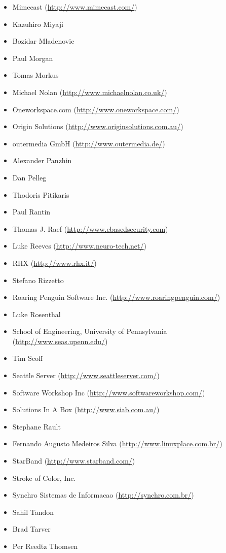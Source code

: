 \documentclass[a4paper,titlepage,12pt]{article}
\begin{document}
\begin{itemize}
	\item Mimecast (\url{http://www.mimecast.com/})
	\item Kazuhiro Miyaji
	\item Bozidar Mladenovic
	\item Paul Morgan
	\item Tomas Morkus
	\item Michael Nolan (\url{http://www.michaelnolan.co.uk/})
	\item Oneworkspace.com (\url{http://www.oneworkspace.com/})
	\item Origin Solutions (\url{http://www.originsolutions.com.au/})
	\item outermedia GmbH (\url{http://www.outermedia.de/})
	\item Alexander Panzhin
	\item Dan Pelleg
	\item Thodoris Pitikaris
	\item Paul Rantin
	\item Thomas J. Raef (\url{http://www.ebasedsecurity.com})
	\item Luke Reeves (\url{http://www.neuro-tech.net/})
	\item RHX (\url{http://www.rhx.it/})
	\item Stefano Rizzetto
	\item Roaring Penguin Software Inc. (\url{http://www.roaringpenguin.com/})
	\item Luke Rosenthal
	\item School of Engineering, University of Pennsylvania (\url{http://www.seas.upenn.edu/})
	\item Tim Scoff
	\item Seattle Server (\url{http://www.seattleserver.com/})
	\item Software Workshop Inc (\url{http://www.softwareworkshop.com/})
	\item Solutions In A Box (\url{http://www.siab.com.au/})
	\item Stephane Rault
	\item Fernando Augusto Medeiros Silva (\url{http://www.linuxplace.com.br/})
	\item StarBand (\url{http://www.starband.com/})
	\item Stroke of Color, Inc.
	\item Synchro Sistemas de Informacao (\url{http://synchro.com.br/})
	\item Sahil Tandon
	\item Brad Tarver
	\item Per Reedtz Thomsen

\end{itemize}
\end{document}
